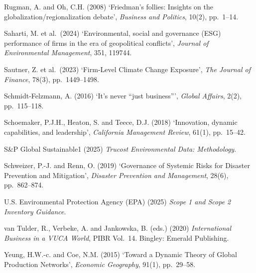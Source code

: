 \documentclass[12pt,a4paper]{article}
\begin{document}
Rugman, A. and Oh, C.H. (2008) `Friedman's follies: Insights on the globalization/regionalization debate', \textit{Business and Politics}, 10(2), pp.\ 1--14.

Saharti, M. et al.\ (2024) `Environmental, social and governance (ESG) performance of firms in the era of geopolitical conflicts', \textit{Journal of Environmental Management}, 351, 119744.

Sautner, Z. et al.\ (2023) `Firm-Level Climate Change Exposure', \textit{The Journal of Finance}, 78(3), pp.\ 1449--1498.

Schmidt-Felzmann, A. (2016) `It's never ``just business''', \textit{Global Affairs}, 2(2), pp.\ 115--118.

Schoemaker, P.J.H., Heaton, S. and Teece, D.J. (2018) `Innovation, dynamic capabilities, and leadership', \textit{California Management Review}, 61(1), pp.\ 15--42.

S\&P Global Sustainable1 (2025) \textit{Trucost Environmental Data: Methodology}.

Schweizer, P.-J. and Renn, O. (2019) `Governance of Systemic Risks for Disaster Prevention and Mitigation', \textit{Disaster Prevention and Management}, 28(6), pp.\ 862--874.

U.S. Environmental Protection Agency (EPA) (2025) \textit{Scope 1 and Scope 2 Inventory Guidance}.

van Tulder, R., Verbeke, A. and Jankowska, B. (eds.) (2020) \textit{International Business in a VUCA World}, PIBR Vol.\ 14. Bingley: Emerald Publishing.

Yeung, H.W.-c. and Coe, N.M. (2015) `Toward a Dynamic Theory of Global Production Networks', \textit{Economic Geography}, 91(1), pp.\ 29--58.
\end{document}
